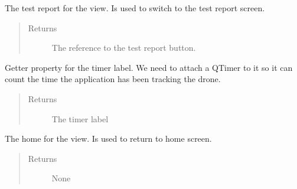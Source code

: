 \documentclass[letterpaper,10pt,english]{sphinxmanual}
\begin{document}
\begin{fulllineitems}
\begin{fulllineitems}
\label{\detokenize{index:src.Views.View_LoadingScreen.LoadingWindow.BtnTestReport}}
The test report for the view. Is used to switch to the test report screen.
\begin{quote}\begin{description}
\item[{Returns}] \leavevmode
The reference to the test report button.

\end{description}\end{quote}

\end{fulllineitems}


\begin{fulllineitems}
\label{\detokenize{index:src.Views.View_LoadingScreen.LoadingWindow.LblStatus}}
Getter property for the timer label. We need to attach a QTimer to it so it can count the time the
application has been tracking the drone.
\begin{quote}\begin{description}
\item[{Returns}] \leavevmode
The timer label

\end{description}\end{quote}

\end{fulllineitems}


\begin{fulllineitems}
\label{\detokenize{index:src.Views.View_LoadingScreen.LoadingWindow.del_BtnHome}}
The home for the view. Is used to return to home screen.
\begin{quote}\begin{description}
\item[{Returns}] \leavevmode
None


\end{description}
\end{quote}
\end{fulllineitems}
\end{fulllineitems}
\end{document}

